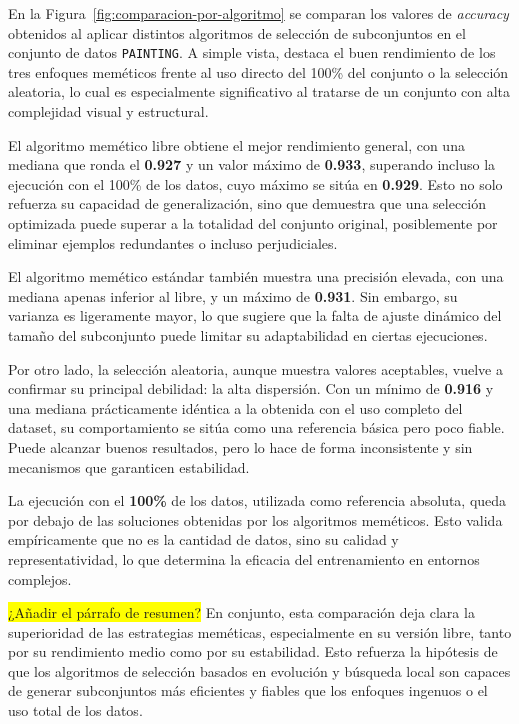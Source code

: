 En la Figura~\ref{fig:comparacion-por-algoritmo} se comparan los valores de \textit{accuracy} obtenidos al aplicar distintos
algoritmos de selección de subconjuntos en el conjunto de datos \texttt{PAINTING}.
A simple vista, destaca el buen rendimiento de los tres enfoques meméticos frente al uso directo del 100\% del conjunto o la selección aleatoria,
lo cual es especialmente significativo al tratarse de un conjunto con alta complejidad visual y estructural.

El algoritmo memético libre obtiene el mejor rendimiento general, con una mediana que ronda el \textbf{0.927} y un valor máximo de \textbf{0.933},
superando incluso la ejecución con el 100\% de los datos, cuyo máximo se sitúa en \textbf{0.929}.
Esto no solo refuerza su capacidad de generalización, sino que demuestra que una selección optimizada puede superar a la totalidad del conjunto original,
posiblemente por eliminar ejemplos redundantes o incluso perjudiciales.

El algoritmo memético estándar también muestra una precisión elevada, con una mediana apenas inferior al libre, y un máximo de \textbf{0.931}.
Sin embargo, su varianza es ligeramente mayor, lo que sugiere que la falta de ajuste dinámico del tamaño del subconjunto puede limitar su adaptabilidad en ciertas ejecuciones.

Por otro lado, la selección aleatoria, aunque muestra valores aceptables, vuelve a confirmar su principal debilidad: la alta dispersión.
Con un mínimo de \textbf{0.916} y una mediana prácticamente idéntica a la obtenida con el uso completo del dataset, su comportamiento se sitúa como una referencia básica pero poco fiable.
Puede alcanzar buenos resultados, pero lo hace de forma inconsistente y sin mecanismos que garanticen estabilidad.

La ejecución con el \textbf{100\%} de los datos, utilizada como referencia absoluta, queda por debajo de las soluciones obtenidas por los algoritmos meméticos.
Esto valida empíricamente que no es la cantidad de datos, sino su calidad y representatividad, lo que determina la eficacia del entrenamiento en entornos complejos.

\colorbox{yellow}{¿Añadir el párrafo de resumen?}
En conjunto, esta comparación deja clara la superioridad de las estrategias meméticas, especialmente en su versión libre,
tanto por su rendimiento medio como por su estabilidad.
Esto refuerza la hipótesis de que los algoritmos de selección basados en evolución y búsqueda local son capaces de generar
subconjuntos más eficientes y fiables que los enfoques ingenuos o el uso total de los datos.

